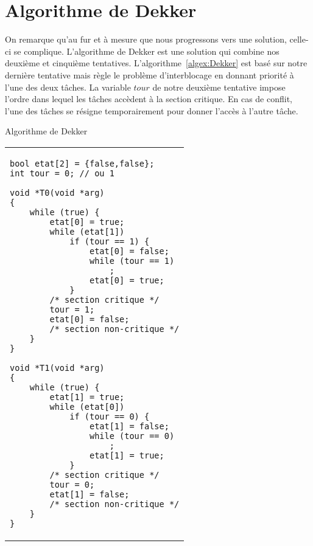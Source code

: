 \section{Algorithme de Dekker}
On remarque qu'au fur et à mesure que nous progressons vers une solution, celle-ci se complique. L'algorithme de Dekker est une solution qui combine nos deuxième et cinquième tentatives.
L'algorithme~\ref{algex:Dekker} est basé sur notre dernière tentative mais règle le problème d'interblocage en donnant priorité à l'une des deux tâches.  La variable $tour$ de notre deuxième tentative impose l'ordre dans lequel les tâches accèdent à la section critique.  En cas de conflit, l'une des tâches se résigne temporairement pour donner l'accès à l'autre tâche.
\begin{algorithm}[!ht]
\caption{Algorithme de Dekker}\label{algex:Dekker}
\begin{center}
\begin{tabular}{l}
\lstset{language=C++}
\begin{lstlisting}
bool etat[2] = {false,false};
int tour = 0; // ou 1

void *T0(void *arg)
{
	while (true) {
		etat[0] = true;
		while (etat[1])
			if (tour == 1) {
				etat[0] = false;
				while (tour == 1)
					;
				etat[0] = true;
			}
		/* section critique */
		tour = 1;
		etat[0] = false;
		/* section non-critique */
	}
}

void *T1(void *arg)
{
	while (true) {
		etat[1] = true;
		while (etat[0])
			if (tour == 0) {
				etat[1] = false;
				while (tour == 0)
					;
				etat[1] = true;
			}
		/* section critique */
		tour = 0;
		etat[1] = false;
		/* section non-critique */
	}
}
\end{lstlisting}
\end{tabular}
\end{center}
\end{algorithm}

